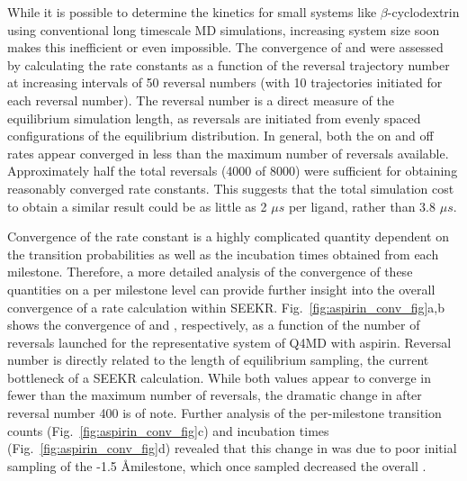 While it is possible to determine the kinetics for small systems like 
$\beta$-cyclodextrin using conventional long timescale MD simulations, increasing 
system size soon makes this inefficient or even impossible. 
The convergence of \kon and \koff were assessed by calculating the rate 
constants as a function of the reversal trajectory number at increasing intervals 
of 50 reversal numbers (with 10 trajectories initiated for each reversal number).
The reversal number is a direct measure of the equilibrium simulation length, as 
reversals are initiated from evenly spaced configurations of the equilibrium distribution.
In general, both the on and off rates appear converged in less than the maximum 
number of reversals available. Approximately half the total reversals 
(4000 of 8000) were sufficient for obtaining reasonably converged rate constants. 
This suggests that the total simulation cost to obtain a similar result could be 
as little as 2 ${\mu}s$ per ligand, rather than 3.8 ${\mu}s$.

%
%
%
%

\par Convergence of the rate constant is a highly complicated quantity dependent 
on the transition probabilities as well as the incubation times obtained from 
each milestone. Therefore, a more detailed analysis of the convergence of 
these quantities on a per milestone level can provide further insight into the 
overall convergence of a rate calculation within SEEKR. Fig.~\ref{fig:aspirin_conv_fig}a,b shows the convergence
of \kon and \koff, respectively, as a function of the number of reversals
launched for the representative system of Q4MD \bcd with aspirin. Reversal number is directly related to the length of
equilibrium sampling, the current bottleneck of a SEEKR
calculation.
While both values appear to converge in fewer than the maximum
number of reversals, the dramatic change in \koff after
reversal number 400 is of note. Further analysis of the
per-milestone transition counts (Fig.~\ref{fig:aspirin_conv_fig}c) and
incubation times (Fig.~\ref{fig:aspirin_conv_fig}d) revealed
that this change in \koff was due to poor initial sampling of
the -1.5 \AA milestone, which once sampled decreased the overall \koff. 

